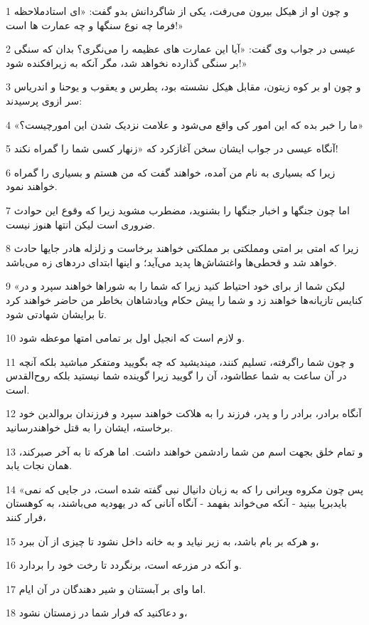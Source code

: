 \par 1 و چون او از هیکل بیرون می‌رفت، یکی از شاگردانش بدو گفت: «ای استادملاحظه فرما چه نوع سنگها و چه عمارت ها است!»
\par 2 عیسی در جواب وی گفت: «آیا این عمارت های عظیمه را می‌نگری؟ بدان که سنگی بر سنگی گذارده نخواهد شد، مگر آنکه به زیرافکنده شود!»
\par 3 و چون او بر کوه زیتون، مقابل هیکل نشسته بود، پطرس و یعقوب و یوحنا و اندریاس سر ازوی پرسیدند:
\par 4 «ما را خبر بده که این امور کی واقع می‌شود و علامت نزدیک شدن این امورچیست؟»
\par 5 آنگاه عیسی در جواب ایشان سخن آغازکرد که «زنهار کسی شما را گمراه نکند!
\par 6 زیرا که بسیاری به نام من آمده، خواهند گفت که من هستم و بسیاری را گمراه خواهند نمود.
\par 7 اما چون جنگها و اخبار جنگها را بشنوید، مضطرب مشوید زیرا که وقوع این حوادث ضروری است لیکن انتها هنوز نیست.
\par 8 زیرا که امتی بر امتی ومملکتی بر مملکتی خواهند برخاست و زلزله هادر جایها حادث خواهد شد و قحطی‌ها واغتشاش‌ها پدید می‌آید؛ و اینها ابتدای دردهای زه می‌باشد.
\par 9 «لیکن شما از برای خود احتیاط کنید زیرا که شما را به شوراها خواهند سپرد و در کنایس تازیانه‌ها خواهند زد و شما را پیش حکام وپادشاهان بخاطر من حاضر خواهند کرد تا برایشان شهادتی شود.
\par 10 و لازم است که انجیل اول بر تمامی امتها موعظه شود.
\par 11 و چون شما راگرفته، تسلیم کنند، میندیشید که چه بگویید ومتفکر مباشید بلکه آنچه در آن ساعت به شما عطاشود، آن را گویید زیرا گوینده شما نیستید بلکه روح‌القدس است.
\par 12 آنگاه برادر، برادر را و پدر، فرزند را به هلاکت خواهند سپرد و فرزندان بروالدین خود برخاسته، ایشان را به قتل خواهندرسانید.
\par 13 و تمام خلق بجهت اسم من شما رادشمن خواهند داشت. اما هر‌که تا به آخر صبرکند، همان نجات یابد.
\par 14 «پس چون مکروه ویرانی را که به زبان دانیال نبی گفته شده است، در جایی که نمی بایدبرپا بینید - آنکه می‌خواند بفهمد - آنگاه آنانی که در یهودیه می‌باشند، به کوهستان فرار کنند،
\par 15 و هر‌که بر بام باشد، به زیر نیاید و به خانه داخل نشود تا چیزی از آن ببرد،
\par 16 و آنکه در مزرعه است، برنگردد تا رخت خود را بردارد.
\par 17 اما وای بر آبستنان و شیر دهندگان در آن ایام.
\par 18 و دعاکنید که فرار شما در زمستان نشود،
